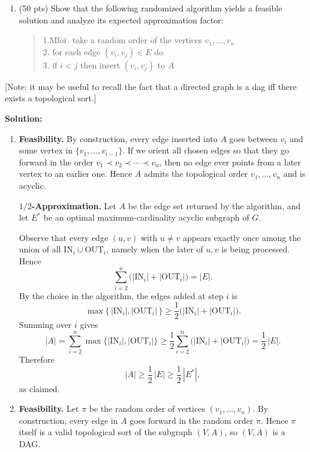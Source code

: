 \documentclass[11pt]{article}
\begin{document}
\begin{description}
\begin{enumerate}
\medskip
\item[(b)] (50 pts) Show that the following randomized algorithm yields
a feasible solution and analyze its expected approximation factor:
\begin{quote}
\begin{tabbing}
1.M\= for\=.\> take a random order of the vertices $v_1,\ldots,v_n$\\
2.\> for each edge $(v_i,v_j)\in E$ do\\
3.\>\> if $i<j$ then insert $(v_i,v_j)$ to $A$
\end{tabbing}
\end{quote}
\end{enumerate}

[Note: it may be useful to recall the fact that a directed graph is a dag iff there exists a topological sort.]

\newpage
\textbf{Solution:}
\newcommand{\IN}{\textrm{IN}}
\newcommand{\OUT}{\textrm{OUT}}
\newcommand{\E}{\mathbb{E}}
\begin{enumerate}
\item[(a)]
\textbf{Feasibility.}
By construction, every edge inserted into \(A\) goes between \(v_i\) and some
vertex in \(\{v_1,\dots,v_{i-1}\}\).  If we orient all chosen edges so that they go
forward in the order \(v_1\prec v_2\prec\cdots\prec v_n\), then no edge ever
points from a later vertex to an earlier one.  Hence \(A\) admits the topological
order \(v_1,\dots,v_n\) and is acyclic.

\textbf{\(1/2\)-Approximation.}
Let \(A\) be the edge set returned by the algorithm, and let \(E^*\) be an optimal
maximum-cardinality acyclic subgraph of \(G\).

Observe that every edge \((u,v)\) with \(u\neq v\) appears exactly once among
the union of all \(\IN_i\cup\OUT_i\), namely when the later of \(u,v\)
is being processed.  Hence
\[
\sum_{i=2}^n \bigl(|\IN_i| + |\OUT_i|\bigr)  =  |E|.
\]
By the choice in the algorithm, the edges added at step \(i\) is
\[
\max\{\,|\IN_i|, |\OUT_i|\,\}
\ge \frac12\bigl(|\IN_i|+|\OUT_i|\bigr).
\]
Summing over \(i\) gives
\[
|A|
= \sum_{i=2}^n \max\{|\IN_i|,|\OUT_i|\}
\ge \frac12 \sum_{i=2}^n \bigl(|\IN_i|+|\OUT_i|\bigr)
= \frac12\,|E|.
\]
Therefore
\[
|A| \ge \frac12\,|E|
\ge \frac12\,|E^*|,
\]
as claimed.

\item[(b)]

\textbf{Feasibility.}
Let \(\pi\) be the random order of vertices \((v_1, \dots, v_n)\).
By construction, every edge in \(A\) goes forward in the random order \(\pi\).  Hence \(\pi\) itself is a valid topological sort of the subgraph \((V,A)\), so \((V,A)\) is a DAG.


\end{enumerate}
\end{description}
\end{document}
